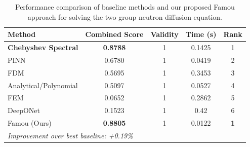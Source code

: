 \begin{table}[t]
\centering
\caption{Performance comparison of baseline methods and our proposed Famou approach for solving the two-group neutron diffusion equation.}
\label{tab:main_results}
\begin{tabular}{lcccc}
\toprule
\textbf{Method} & \textbf{Combined Score} & \textbf{Validity} & \textbf{Time (s)} & \textbf{Rank} \\
\midrule
\textbf{Chebyshev Spectral} & \textbf{0.8788} & 1 & 0.1425 & 1 \\
PINN & 0.6780 & 1 & 0.0419 & 2 \\
FDM & 0.5695 & 1 & 0.3453 & 3 \\
Analytical/Polynomial & 0.5097 & 1 & 0.0527 & 4 \\
FEM & 0.0652 & 1 & 0.2862 & 5 \\
DeepONet & 0.1523 & 1 & 0.42 & 6 \\
\midrule
Famou (Ours) & \textbf{0.8805} & 1 & 0.0122 & \textbf{1} \\
\midrule
\multicolumn{5}{l}{\textit{Improvement over best baseline: +0.19\%}} \\
\bottomrule
\end{tabular}
\end{table}